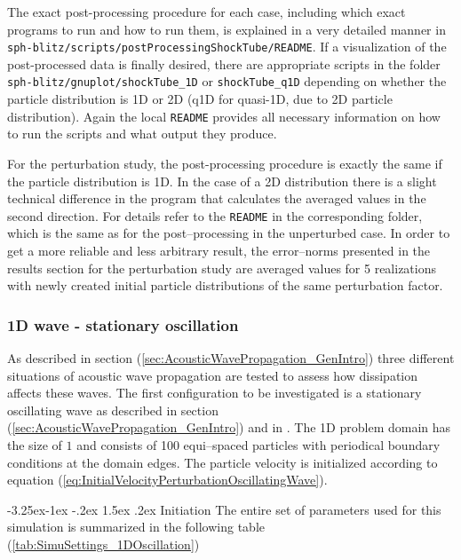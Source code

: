 \documentclass[11pt,a4paper,twoside]{report}
\makeatletter
\renewcommand\paragraph{\@startsection{paragraph}{4}{\z@}%
  {-3.25ex\@plus -1ex \@minus -.2ex}%
  {1.5ex \@plus .2ex}%
  {\normalfont\normalsize\bfseries}}
\makeatother
\begin{document}
The exact post-processing procedure for each case, including which exact programs to run and how to run them, is explained in a very detailed manner in {\tt sph-blitz/scripts/postProcessingShockTube/README}. If a visualization of the post-processed data is finally desired, there are appropriate scripts in the folder {\tt sph-blitz/gnuplot/shockTube\_1D} or {\tt shockTube\_q1D} depending on whether the particle distribution is 1D or 2D (q1D for quasi-1D, due to 2D particle distribution).
Again the local {\tt README} provides all necessary information on how to run the scripts and what output they produce.

For the perturbation study, the post-processing procedure is exactly the same if the particle distribution is 1D. In the case of a 2D distribution there is a slight technical difference in the program that calculates the averaged values in the second direction. For details refer to the {\tt README} in the corresponding folder, which is the same as for the post--processing in the unperturbed case.
In order to get a more reliable and less arbitrary result, the error--norms presented in the results section for the perturbation study are averaged values for 5 realizations with newly created initial particle distributions of the same perturbation factor. %



\subsubsection{1D wave - stationary oscillation}
As described in section (\ref{sec:AcousticWavePropagation_GenIntro}) three different situations of acoustic wave propagation are tested to assess how dissipation affects these waves. The first configuration to be investigated is a stationary oscillating wave as described in section (\ref{sec:AcousticWavePropagation_GenIntro}) and in \cite{Monaghan2005}. The 1D problem domain has the size of $1$ and consists of 100 equi--spaced particles with periodical boundary conditions at the domain edges. The particle velocity is initialized according to equation (\ref{eq:InitialVelocityPerturbationOscillatingWave}).

\paragraph {Initiation}
The entire set of parameters used for this simulation is summarized in the following table (\ref{tab:SimuSettings_1DOscillation})
\end{document}
